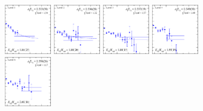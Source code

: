 \begin{figure}[H]
    \includegraphics[width=0.18\textwidth]{figures/sigmas/g2u/fits/fit_18.pdf}
    \includegraphics[width=0.18\textwidth]{figures/sigmas/g2u/fits/fit_4.pdf}
    \includegraphics[width=0.18\textwidth]{figures/sigmas/g2u/fits/fit_2.pdf}
    \includegraphics[width=0.18\textwidth]{figures/sigmas/g2u/fits/fit_14.pdf}\\
    \includegraphics[width=0.18\textwidth]{figures/sigmas/g2u/fits/fit_7.pdf}

\end{figure}
